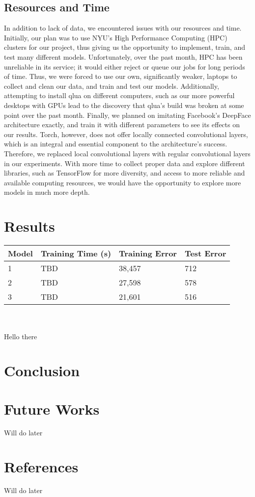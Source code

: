 \documentclass[11pt]{article}
\begin{document}
    \subsection{Resources and Time}
	\par
	In addition to lack of data, we encountered issues with our resources and time. Initially, our plan was to use NYU's High Performance Computing (HPC) clusters for our project, thus giving us the opportunity to implement, train, and test many different models. Unfortunately, over the past month, HPC has been unreliable in its service; it would either reject or queue our jobs for long periods of time. Thus, we were forced to use our own, significantly weaker, laptops to collect and clean our data, and train and test our models. Additionally, attempting to install qlua on different computers, such as our more powerful desktops with GPUs lead to the discovery that qlua's build was  broken at some point over the past month. Finally, we planned on imitating Facebook's DeepFace architecture exactly, and train it with different parameters to see its effects on our results. Torch, however, does not offer locally connected convolutional layers, which is an integral and essential component to the architecture's success. Therefore, we replaced local convolutional layers with regular convolutional layers in our experiments. With more time to collect proper data and explore different libraries, such as TensorFlow for more diversity, and access to more reliable and available computing resources, we would have the opportunity to explore more models in much more depth. 
\section{Results} 



\hskip-1.2cm
\begin{tabular}{ |p{3.5cm}||p{3.5cm}|p{3cm}|p{3cm}|  }
 \hline
 \hline
 Model & Training Time (s) & Training Error & Test Error \\ [1.0ex] 
 \hline\hline
 1 & TBD & 38,457 & 712 \\ 
 \hline
 2 & TBD  & 27,598 & 578 \\
 \hline
 3 & TBD & 21,601 & 516 \\
 \hline

\end{tabular}
\\
\\

Hello there


\section{Conclusion}
    \par
    
\section{Future Works} Will do later
\section{References}

Will do later
\end{document}

